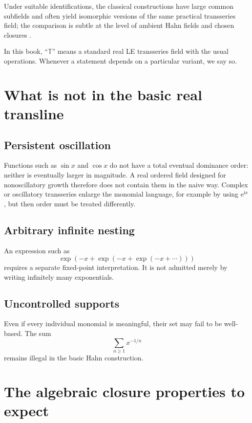 \documentclass[11pt,oneside]{book}
\theoremstyle{definition}
\theoremstyle{remark}
\newcommand{\T}{\mathbb{T}}
\newcommand{\e}{\mathrm{e}}
\begin{document}
Under suitable identifications, the classical constructions have large common
subfields and often yield isomorphic versions of the same practical transseries
field; the comparison is subtle at the level of ambient Hahn fields and chosen
closures \cite{vanDenDriesMacintyreMarker1997,KuhlmannTressl}.

In this book, ``$\T$'' means a standard real LE transseries field with the usual
operations. Whenever a statement depends on a particular variant, we say so.

\section{What is not in the basic real transline}

\subsection{Persistent oscillation}

Functions such as $\sin x$ and $\cos x$ do not have a total eventual dominance
order: neither is eventually larger in magnitude. A real ordered field designed
for nonoscillatory growth therefore does not contain them in the naive way.
Complex or oscillatory transseries enlarge the monomial language, for example by
using $\e^{\mathrm{i}x}$, but then order must be treated differently.

\subsection{Arbitrary infinite nesting}

An expression such as
\[
  \exp(-x+\exp(-x+\exp(-x+\cdots)))
\]
requires a separate fixed-point interpretation. It is not admitted merely by
writing infinitely many exponentials.

\subsection{Uncontrolled supports}

Even if every individual monomial is meaningful, their set may fail to be
well-based. The sum
\[
  \sum_{n\ge1}x^{-1/n}
\]
remains illegal in the basic Hahn construction.

\section{The algebraic closure properties to expect}
\end{document}
